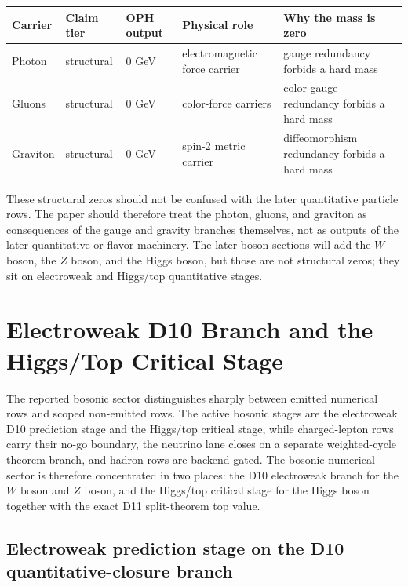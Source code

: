 \documentclass[11pt]{article}
\begin{document}
\begin{table}[h]
\centering
\small
\begin{tabular}{@{}>{\raggedright\arraybackslash}p{}>{\raggedright\arraybackslash}p{}>{\raggedright\arraybackslash}p{}>{\raggedright\arraybackslash}p{}>{\raggedright\arraybackslash}p{}@{}}
\toprule
Carrier & Claim tier & OPH output & Physical role & Why the mass is zero \\
\midrule
Photon & structural & \(0\) GeV & electromagnetic force carrier & gauge redundancy forbids a hard mass \\
Gluons & structural & \(0\) GeV & color-force carriers & color-gauge redundancy forbids a hard mass \\
Graviton & structural & \(0\) GeV & spin-2 metric carrier & diffeomorphism redundancy forbids a hard mass \\
\bottomrule
\end{tabular}
\end{table}

These structural zeros should not be confused with the later quantitative particle rows. The
paper should therefore treat the photon, gluons, and graviton as consequences of the
gauge and gravity branches themselves, not as outputs of the later quantitative or flavor
machinery. The later boson sections will add the \(W\) boson, the \(Z\) boson, and the Higgs
boson, but those are not structural zeros; they sit on electroweak and Higgs/top quantitative stages.

\section{Electroweak D10 Branch and the Higgs/Top Critical Stage}

The reported bosonic sector distinguishes sharply between emitted numerical rows and scoped
non-emitted rows. The active bosonic stages are the electroweak
D10 prediction stage and the Higgs/top critical stage, while charged-lepton rows
carry their no-go boundary, the neutrino lane closes on a separate weighted-cycle theorem branch, and hadron rows are backend-gated. The bosonic numerical
sector is therefore concentrated in two places: the D10 electroweak branch for the \(W\) boson and \(Z\) boson, and
the Higgs/top critical stage for the Higgs boson together with the exact D11 split-theorem top value.

\subsection{Electroweak prediction stage on the D10 quantitative-closure branch}
\end{document}
